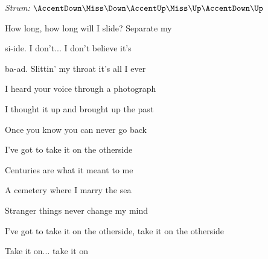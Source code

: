 \begin{song}


\begin{strumbox}
\textit{Strum:} $\AccentDown\Miss\Down\AccentUp\Miss\Up\AccentDown\Up$
\end{strumbox}

\begin{vchordbox}
\vspace{2em}
 \par
{} \par
{} \par
{} \par
{} \par
\end{vchordbox}

\bigskip
 
\Intro {}     \par

\bigskip

\begin{chorusbox}{\Chorus}
 How long, how long will I slide? Separate my \par
{}si-ide. I don't... I don't believe it's \par
{}ba-ad. Slittin' my throat it's all I ever 
\end{chorusbox}

\bigskip

 I heard your voice through a photograph \par
{} I thought it up and brought up the past \par
{} Once you know you can never go back \par
I've got to take it on the otherside 

\bigskip

 Centuries are what it meant to me \par
{} A cemetery where I marry the sea \par
{} Stranger things never change my mind \par
I've got to take it on the otherside, take it on the otherside \par
{}Take it on... take it on

\bigskip


\end{song}
